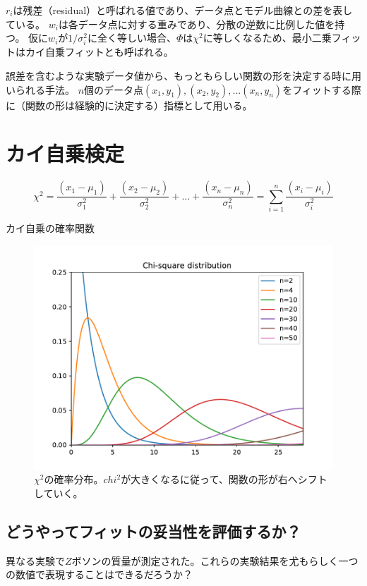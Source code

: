 \documentclass[a4paper,uplatex]{jsreport}
\begin{document}
$r_i$は残差（residual）と呼ばれる値であり、データ点とモデル曲線との差を表している。
$w_i$は各データ点に対する重みであり、分散の逆数に比例した値を持つ。
仮に$w_i$が$1/\sigma_i^2$に全く等しい場合、$\Phi$は$\chi^2$に等しくなるため、最小二乗フィットはカイ自乗フィットとも呼ばれる。


誤差を含むような実験データ値から、もっともらしい関数の形を決定する時に用いられる手法。
$n$個のデータ点$(x_1,y_1), (x_2,y_2), ... (x_n, y_n)$をフィットする際に（関数の形は経験的に決定する）指標として用いる。

\section{カイ自乗検定}

\begin{equation}
  \chi^2 = \frac{(x_1-\mu_1)}{\sigma_1^2} + \frac{(x_2-\mu_2)}{\sigma_2^2} + ... + \frac{(x_n-\mu_n)}{\sigma_n^2} = \sum_{i=1}^{n} \frac{(x_i-\mu_i)}{\sigma_i^2}
\end{equation}

カイ自乗の確率関数

\begin{figure}[h]
  \centering
  \includegraphics[scale=0.5]{python/ChiSquareDistribution.pdf}
  \caption{$\chi^2$の確率分布。$chi^2$が大きくなるに従って、関数の形が右へシフトしていく。}
\end{figure}


\subsection{どうやってフィットの妥当性を評価するか？}
異なる実験で$Z$ボソンの質量が測定された。これらの実験結果を尤もらしく一つの数値で表現することはできるだろうか？
\end{document}
